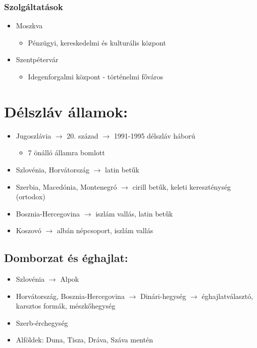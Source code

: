 \documentclass{article}
\begin{document}
\subsubsection{Szolgáltatások}
\begin{itemize}
    \item Moszkva 
    \begin{itemize}
        \item Pénzügyi, kereskedelmi és kulturális központ
    \end{itemize}
    \item Szentpétervár 
    \begin{itemize}
        \item Idegenforgalmi központ - történelmi főváros
    \end{itemize}
\end{itemize}

\section{Délszláv államok:}
\begin{itemize}
    \item Jugoszlávia $\rightarrow$ 20. század $\rightarrow$ 1991-1995 délszláv háború
    \begin{itemize}
        \item 7 önálló államra bomlott
    \end{itemize}
    \item Szlovénia, Horvátország $\rightarrow$ latin betűk
    \item Szerbia, Macedónia, Montenegró $\rightarrow$ cirill betűk, keleti kereszténység (ortodox)
    \item Bosznia-Hercegovina $\rightarrow$ iszlám vallás, latin betűk
    \item Koszovó $\rightarrow$ albán népcsoport, iszlám vallás
\end{itemize}

\subsection{Domborzat és éghajlat:}
\begin{itemize}
    \item Szlovénia $\rightarrow$ Alpok
    \item Horvátország, Bosznia-Hercegovina $\rightarrow$ Dinári-hegység $\rightarrow$ éghajlatválasztó, karsztos formák, mészkőhegység
    \item Szerb-érchegység
    \item Alföldek: Duna, Tisza, Dráva, Száva mentén 
\end{itemize}
\end{document}
